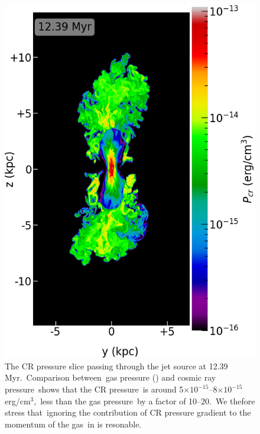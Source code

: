 \documentclass[twocolumn]{aastex631}
\begin{document}
  \begin{figure}
    \includegraphics[width=\columnwidth]{figures/fig__jetI5+ismSeed3-45deg-CR.png}
    \caption{
     The CR pressure slice passing through the jet source at 12.39 Myr.\
     Comparison between\
     gas pressure () and cosmic ray pressure\
     shows that
     the CR pressure\
     is around 5$\times10^{-15}$--8$\times10^{-15}$ erg/cm$^{3}$,\
     less than the gas pressure\
     by a factor of 10--20.\
     We thefore stress that\
     ignoring the contribution of CR pressure gradient to the momentum of the gas\
     in  is resonable.
     }
    \label{fig__jetI5+ismSeed3-45deg-CR}
  \end{figure}
\end{document}
